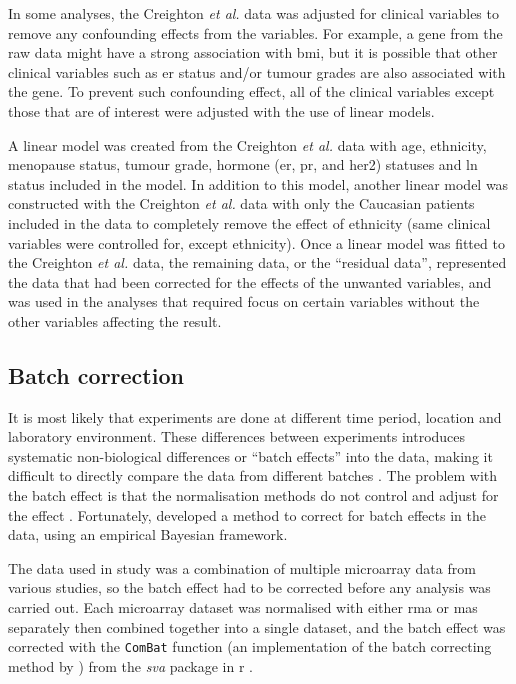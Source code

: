 In some analyses, the Creighton \textit{et al.} data was adjusted for clinical variables to remove any confounding effects from the variables.
For example, a gene from the raw data might have a strong association with \gls{bmi}, but it is possible that other clinical variables such as \gls{er} status and/or tumour grades are also associated with the gene.
To prevent such confounding effect, all of the clinical variables except those that are of interest were adjusted with the use of linear models.

A linear model was created from the Creighton \textit{et al.} data with age, ethnicity, menopause status, tumour grade, hormone (\gls{er}, \gls{pr}, and \gls{her2}) statuses  and \gls{ln} status included in the model.
In addition to this model, another linear model was constructed with the Creighton \textit{et al.} data with only the Caucasian patients included in the data to completely remove the effect of ethnicity (same clinical variables were controlled for, except ethnicity).
Once a linear model was fitted to the Creighton \textit{et al.} data, the remaining data, or the ``residual data'', represented the data that had been corrected for the effects of the unwanted variables, and was used in the analyses that required focus on certain variables without the other variables affecting the result.

\subsection{Batch correction}
\label{sub:batch_correction}

It is most likely that experiments are done at different time period, location and laboratory environment.
These differences between experiments introduces systematic non-biological differences or ``batch effects'' into the data, making it difficult to directly compare the data from different batches \citep{Johnson2007}.
The problem with the batch effect is that the normalisation methods do not control and adjust for the effect \citep{Johnson2007}.
Fortunately, \citet{Johnson2007} developed a method to correct for batch effects in the data, using an empirical Bayesian framework.

The data used in \citet{Gatza2010a} study was a combination of multiple microarray data from various studies, so the batch effect had to be corrected before any analysis was carried out.
Each microarray dataset was normalised with either \gls{rma} or \Gls{mas} separately then combined together into a single dataset, and the batch effect was corrected with the \texttt{ComBat} function (an implementation of the batch correcting method by \citet{Johnson2007}) from the \textit{sva} package in \gls{r} \citep{Leek2012}.

